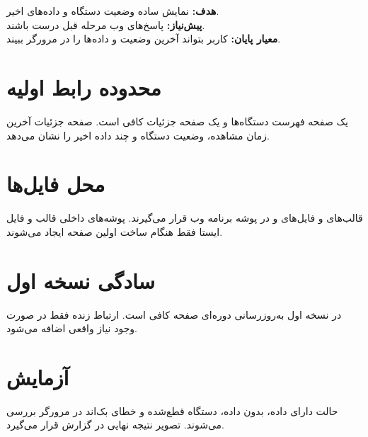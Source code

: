 \begin{phasebox}
\textbf{هدف:} نمایش ساده وضعیت دستگاه و داده‌های اخیر.\\
\textbf{پیش‌نیاز:} پاسخ‌های وب مرحله قبل درست باشند.\\
\textbf{معیار پایان:} کاربر بتواند آخرین وضعیت و داده‌ها را در مرورگر ببیند.
\end{phasebox}

\section{محدوده رابط اولیه}
یک صفحه فهرست دستگاه‌ها و یک صفحه جزئیات کافی است. صفحه جزئیات آخرین زمان مشاهده، وضعیت دستگاه و چند داده اخیر را نشان می‌دهد.

\section{محل فایل‌ها}
قالب‌های
و فایل‌های
و
در پوشه برنامه وب قرار می‌گیرند. پوشه‌های داخلی قالب و فایل ایستا فقط هنگام ساخت اولین صفحه ایجاد می‌شوند.

\section{سادگی نسخه اول}
در نسخه اول به‌روزرسانی دوره‌ای صفحه کافی است. ارتباط زنده
فقط در صورت وجود نیاز واقعی اضافه می‌شود.

\section{آزمایش}
حالت دارای داده، بدون داده، دستگاه قطع‌شده و خطای بک‌اند در مرورگر بررسی می‌شوند. تصویر نتیجه نهایی در گزارش قرار می‌گیرد.
